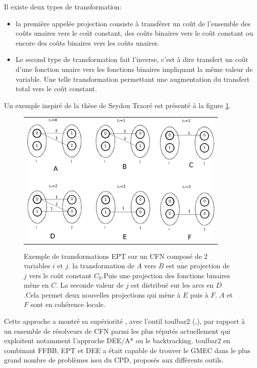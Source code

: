 Il existe deux types de transformation:
\begin{itemize}
\item la première appelée projection consiste à transférer un coût de l'ensemble des coûts unaires vers le coût constant, des coûts binaires vers le coût constant ou encore des coûts binaires vers les coûts unaires.
\item Le second type de transformation fait l'inverse, c'est à dire transfert un coût d'une fonction unaire vers les fonctions binaires impliquant la même valeur de variable. Une telle transformation permettant une augmentation du transfert total vers le coût constant.
\end{itemize}

Un exemple inspiré de la thèse de Seydou Traoré est présenté à  la figure \ref{fig:EPT}.



\begin{figure}[!htbp]
  \centering
  \begin{tabular}{c}
    \includegraphics[width=10cm]{figure/coherences_local.png} \\
  \end{tabular}
  \caption{Exemple de transformations EPT sur un CFN composé de 2 variables $i$ et $j$. la transformation de $A$ vers $B$ est une projection de $j$ vers le coût constant $C_0$.Puis une projection des fonctions binaires mène en $C$. La seconde valeur de $j$ est distribué sur les arcs en $D$.Cela permet deux nouvelles projections qui mène à $E$ puis à $F$. $A$ et $F$ sont en cohérence locale.}
  \label{fig:EPT}
\end{figure}




Cette approche a montré sa supériorité , avec l'outil toulbar2 (\cite{Allouche14},\cite{Traoré13}), par rapport à un ensemble de résolveurs de CFN parmi les plus réputés actuellement qui exploitent notamment l'approche DEE/A* ou le backtracking. toulbar2 en combinant FFBB, EPT et DEE a était capable de trouver le GMEC dans le plus grand nombre de problèmes issu du CPD, proposés aux différents outils.
